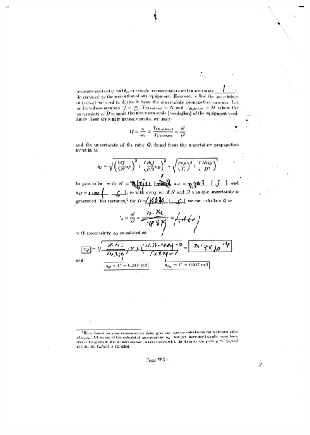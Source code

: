 \documentclass[a4paper]{report}
\begin{document}
	\begin{figure}[H]
		\centering
		\includegraphics[width=1\linewidth]{9.jpg}
	\end{figure}
\end{document}
